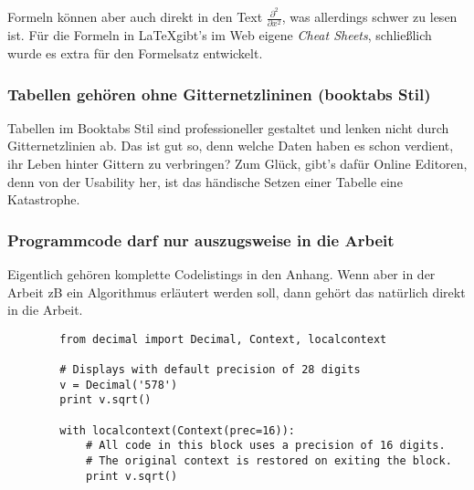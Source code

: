 Formeln können aber auch direkt in den Text $\frac{\partial^2 }{\partial x^2}$, was allerdings schwer zu lesen ist. 
Für die Formeln in \LaTeX gibt's im Web eigene \textit{Cheat Sheets}, schließlich wurde es extra für den Formelsatz entwickelt.


\subsubsection{Tabellen gehören ohne Gitternetzlininen (booktabs Stil)}
Tabellen im Booktabs Stil sind professioneller gestaltet und lenken nicht durch Gitternetzlinien ab. Das ist gut so, denn welche Daten haben es schon verdient, ihr Leben hinter Gittern zu verbringen?
Zum Glück, gibt's dafür Online Editoren, denn von der Usability her, ist das händische Setzen einer Tabelle eine Katastrophe. 




\subsubsection{Programmcode darf nur auszugsweise in die Arbeit}

Eigentlich gehören komplette Codelistings in den Anhang. 
Wenn aber in der Arbeit zB ein Algorithmus erläutert werden soll, dann gehört das natürlich direkt in die Arbeit. 

\begin{verbatim}
        from decimal import Decimal, Context, localcontext
        
        # Displays with default precision of 28 digits
        v = Decimal('578')
        print v.sqrt()
        
        with localcontext(Context(prec=16)):
            # All code in this block uses a precision of 16 digits.
            # The original context is restored on exiting the block.
            print v.sqrt()   
\end{verbatim} 
    
